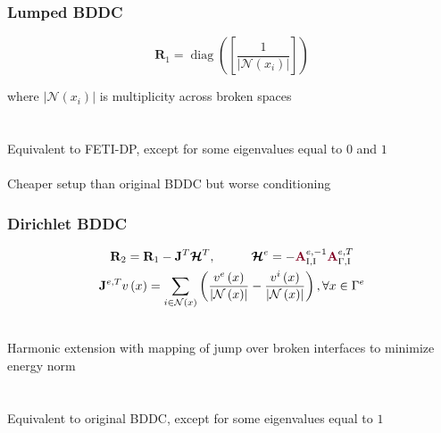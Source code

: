 \documentclass{beamer}
\DeclareMathOperator{\diag}{diag}
\begin{document}
\begin{frame}
\begin{center}
\frametitle{Lumped BDDC}

\begin{equation}
\mathbf{R}_1 = \diag \left( \left[ \frac{1}{\lvert \mathcal{N} \left( x_i \right) \rvert} \right] \right)
\end{equation}

where $\lvert \mathcal{N} \left( x_i \right) \rvert$ is multiplicity across broken spaces\\

~\\

~\\

Equivalent to FETI-DP, except for some eigenvalues equal to $0$ and $1$ \cite{li2007use}\\

~\\

Cheaper setup than original BDDC but worse conditioning

\end{center}
\end{frame}


\begin{frame}
\begin{center}
\frametitle{Dirichlet BDDC}

\begin{equation}
\begin{gathered}
\mathbf{R}_2 = \mathbf{R}_1 - \mathbf{J}^T \boldsymbol{\mathcal{H}}^T, \hspace{10mm} \boldsymbol{\mathcal{H}}^e = - {\color{burgundy}\mathbf{A}}_{\text{I}, \text{I}}^{e, -1} {\color{burgundy}\mathbf{A}}_{\Gamma, \text{I}}^{e, T}\\
\mathbf{J}^{e, T} v \left( x \right) = \sum_{i \in \mathcal{N} \left( x \right)} \left( \frac{v^e \left( x \right)}{\lvert \mathcal{N} \left( x \right) \rvert} - \frac{v^i \left( x \right)}{\lvert \mathcal{N} \left( x \right) \rvert} \right), \forall x \in \Gamma^e
\end{gathered}
\end{equation}

~\\

Harmonic extension with mapping of jump over broken interfaces to minimize energy norm\\

~\\

~\\

Equivalent to original BDDC, except for some eigenvalues equal to $1$ \cite{li2007use}

\end{center}
\end{frame}
\end{document}
